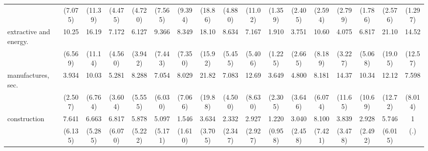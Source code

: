 {\begin{tabular}{l*{16}{c}}
                    &     (7.075)         &     (11.39)         &     (4.475)         &     (4.720)         &     (7.565)         &     (9.394)         &     (18.86)         &     (4.880)         &     (11.02)         &     (1.359)         &     (2.405)         &     (2.594)         &     (2.799)         &     (1.786)         &     (2.576)         &     (1.297)         \\
[1em]
extractive and energy.&       10.25\sym{***}&       16.19\sym{***}&       7.172\sym{**} &       6.127\sym{**} &       9.366\sym{**} &       8.349\sym{*}  &       18.10\sym{***}&       8.634\sym{***}&       7.167\sym{**} &       1.910         &       3.751         &       10.60\sym{**} &       4.075         &       6.817\sym{**} &       21.10\sym{***}&       14.52\sym{**} \\
                    &     (6.569)         &     (11.14)         &     (4.560)         &     (3.942)         &     (7.443)         &     (7.350)         &     (15.92)         &     (5.455)         &     (5.406)         &     (1.225)         &     (2.665)         &     (8.189)         &     (3.227)         &     (5.068)         &     (19.05)         &     (12.57)         \\
[1em]
manufactures, sec.  &       3.934\sym{*}  &       10.03\sym{***}&       5.281\sym{*}  &       8.288\sym{**} &       7.054\sym{*}  &       8.029\sym{*}  &       21.82\sym{***}&       7.083\sym{**} &       12.69\sym{***}&       3.649\sym{*}  &       4.800\sym{*}  &       8.181\sym{**} &       14.37\sym{**} &       10.34\sym{*}  &       12.12\sym{*}  &       7.598         \\
                    &     (2.507)         &     (6.764)         &     (3.604)         &     (5.555)         &     (6.030)         &     (7.066)         &     (19.88)         &     (4.500)         &     (8.630)         &     (2.305)         &     (3.646)         &     (6.074)         &     (11.65)         &     (10.69)         &     (12.72)         &     (8.014)         \\
[1em]
construction        &       7.641\sym{*}  &       6.663\sym{*}  &       6.817\sym{*}  &       5.878\sym{*}  &       5.097         &       1.546         &       3.634         &       2.332         &       2.927         &       1.220         &       3.040         &       8.100\sym{*}  &       3.839         &       2.928         &       5.746         &           1         \\
                    &     (6.135)         &     (5.285)         &     (6.070)         &     (5.222)         &     (5.171)         &     (1.610)         &     (3.705)         &     (2.347)         &     (2.927)         &     (0.958)         &     (2.458)         &     (7.421)         &     (3.478)         &     (2.492)         &     (6.015)         &         (.)         \\

\end{tabular}}
